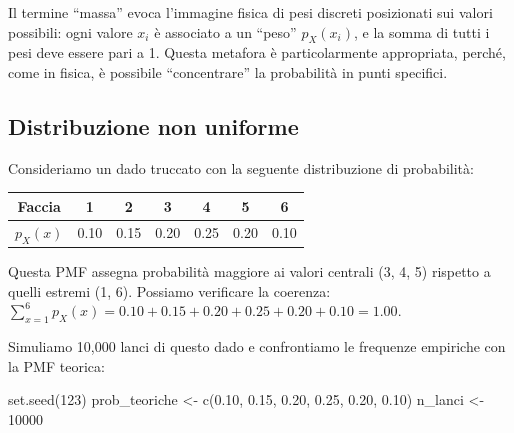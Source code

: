 \documentclass[
  letterpaper,
  DIV=11,
  numbers=noendperiod,
  oneside]{scrreprt}
\newenvironment{Shaded}{\begin{snugshade}}{\end{snugshade}}
\newcommand{\DecValTok}[1]{\textcolor[rgb]{0.68,0.00,0.00}{#1}}
\newcommand{\FloatTok}[1]{\textcolor[rgb]{0.68,0.00,0.00}{#1}}
\newcommand{\FunctionTok}[1]{\textcolor[rgb]{0.28,0.35,0.67}{#1}}
\newcommand{\NormalTok}[1]{\textcolor[rgb]{0.00,0.23,0.31}{#1}}
\newcommand{\OtherTok}[1]{\textcolor[rgb]{0.00,0.23,0.31}{#1}}
\theoremstyle{definition}
\theoremstyle{plain}
\theoremstyle{definition}
\theoremstyle{remark}
\begin{document}
Il termine ``massa'' evoca l'immagine fisica di pesi discreti
posizionati sui valori possibili: ogni valore \(x_i\) è associato a un
``peso'' \(p_X(x_i)\), e la somma di tutti i pesi deve essere pari a 1.
Questa metafora è particolarmente appropriata, perché, come in fisica, è
possibile ``concentrare'' la probabilità in punti specifici.

\begin{tcolorbox}[enhanced jigsaw, arc=.35mm, breakable, colbacktitle=quarto-callout-note-color!10!white, opacityback=0, toprule=.15mm, rightrule=.15mm, colback=white, opacitybacktitle=0.6, leftrule=.75mm, coltitle=black, bottomtitle=1mm, left=2mm, toptitle=1mm, title=\textcolor{quarto-callout-note-color}{\faInfo}\hspace{0.5em}{Esempio: Dado sbilanciato}, titlerule=0mm, bottomrule=.15mm, colframe=quarto-callout-note-color-frame]

\subsection*{Distribuzione non
uniforme}\label{distribuzione-non-uniforme}

Consideriamo un dado truccato con la seguente distribuzione di
probabilità:

\begin{longtable}[]{@{}ccccccc@{}}
\toprule\noalign{}
Faccia & 1 & 2 & 3 & 4 & 5 & 6 \\
\midrule\noalign{}
\endhead
\bottomrule\noalign{}
\endlastfoot
\(p_X(x)\) & 0.10 & 0.15 & 0.20 & 0.25 & 0.20 & 0.10 \\
\end{longtable}

Questa PMF assegna probabilità maggiore ai valori centrali (3, 4, 5)
rispetto a quelli estremi (1, 6). Possiamo verificare la coerenza:
\(\sum_{x=1}^{6} p_X(x) = 0.10 + 0.15 + 0.20 + 0.25 + 0.20 + 0.10 = 1.00\).

Simuliamo 10,000 lanci di questo dado e confrontiamo le frequenze
empiriche con la PMF teorica:

\begin{Shaded}
\begin{Highlighting}[]
\FunctionTok{set.seed}\NormalTok{(}\DecValTok{123}\NormalTok{)}
\NormalTok{prob\_teoriche }\OtherTok{\textless{}{-}} \FunctionTok{c}\NormalTok{(}\FloatTok{0.10}\NormalTok{, }\FloatTok{0.15}\NormalTok{, }\FloatTok{0.20}\NormalTok{, }\FloatTok{0.25}\NormalTok{, }\FloatTok{0.20}\NormalTok{, }\FloatTok{0.10}\NormalTok{)}
\NormalTok{n\_lanci }\OtherTok{\textless{}{-}} \DecValTok{10000}


\end{Highlighting}
\end{Shaded}
\end{tcolorbox}
\end{document}
